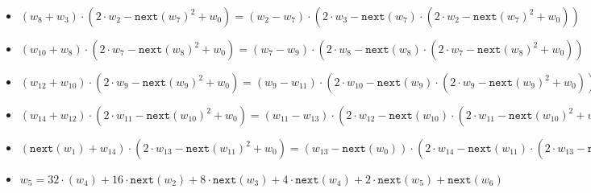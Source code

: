 \begin{itemize}
    \item $(w_{8} + w_{3}) \cdot (2 \cdot w_2 - \texttt{next}(w_7)^2 + w_{0}) = (w_2 - w_7) \cdot (2\cdot w_{3} - \texttt{next}(w_7) \cdot (2 \cdot w_2 - \texttt{next}(w_7)^2 + w_{0}))$
    \item $(w_{10} + w_{8}) \cdot (2 \cdot w_7 - \texttt{next}(w_8)^2 + w_{0}) = (w_7 - w_9) \cdot (2\cdot w_{8} - \texttt{next}(w_8) \cdot (2 \cdot w_7 - \texttt{next}(w_8)^2 + w_{0}))$
    \item $(w_{12} + w_{10}) \cdot (2 \cdot w_9 - \texttt{next}(w_9)^2 + w_{0}) = (w_9 - w_{11}) \cdot (2\cdot w_{10} - \texttt{next}(w_9) \cdot (2 \cdot w_9 - \texttt{next}(w_9)^2 + w_{0}))$
    \item $(w_{14} + w_{12}) \cdot  (2 \cdot w_{11} - \texttt{next}(w_{10})^2 + w_{0}) = (w_{11} - w_{13}) \cdot (2\cdot w_{12} - \texttt{next}(w_{10}) \cdot (2 \cdot w_{11} - \texttt{next}(w_{10})^2 + w_{0}))$
    \item $(\texttt{next}(w_{1}) + w_{14}) \cdot (2 \cdot w_{13} - \texttt{next}(w_{11})^2 + w_{0}) = (w_{13} - \texttt{next}(w_{0})) \cdot (2\cdot w_{14} - \texttt{next}(w_{11}) \cdot (2 \cdot w_{13} - \texttt{next}(w_{11})^2 + w_{0}))$ \\


    \item $w_5 = 32 \cdot (w_4) + 16 \cdot \texttt{next}(w_{2}) + 8 \cdot \texttt{next}(w_{3}) + 4 \cdot \texttt{next}(w_{4}) + 2 \cdot \texttt{next}(w_{5}) + \texttt{next}(w_{6})$
    \end{itemize}

